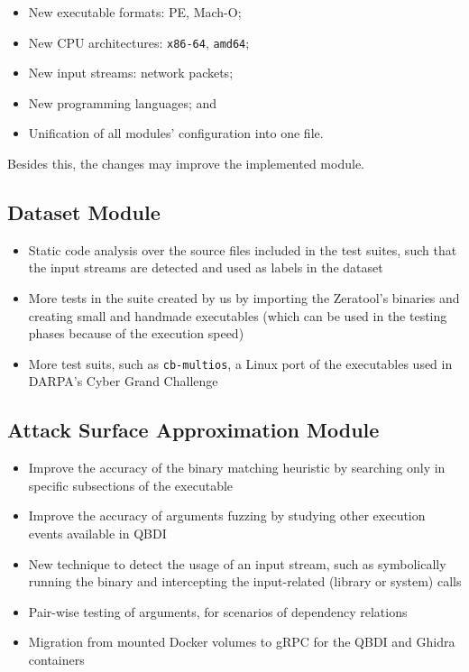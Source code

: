 \documentclass[../main.tex]{subfiles}
\begin{document}
\begin{itemize}
\tightlist
\item
  New executable formats: PE, Mach-O;
\item
  New CPU architectures: \texttt{x86-64}, \texttt{amd64};
\item
  New input streams: network packets;
\item
  New programming languages; and
\item
  Unification of all modules' configuration into one file.
\end{itemize}

Besides this, the changes may improve the implemented module.

\hypertarget{dataset-module}{%
\subsection{Dataset Module}\label{future-dataset-module}}

\begin{itemize}
\tightlist
\item
  Static code analysis over the source files included in the test
  suites, such that the input streams are detected and used as labels in
  the dataset
\item
  More tests in the suite created by us by importing the Zeratool's
  binaries and creating small and handmade executables (which can be
  used in the testing phases because of the execution speed)
\item
  More test suits, such as \texttt{cb-multios}, a Linux port of
  the executables used in DARPA's Cyber Grand Challenge
\end{itemize}

\hypertarget{attack-surface-approximation-module}{%
\subsection{Attack Surface Approximation
Module}\label{attack-surface-approximation-module}}

\begin{itemize}
\tightlist
\item
  Improve the accuracy of the binary matching heuristic by searching
  only in specific subsections of the executable
\item
  Improve the accuracy of arguments fuzzing by studying other execution
  events available in QBDI
\item
  New technique to detect the usage of an input stream, such as
  symbolically running the binary and intercepting the input-related
  (library or system) calls
\item
  Pair-wise testing of arguments, for scenarios of dependency relations
\item
  Migration from mounted Docker volumes to gRPC for the QBDI and Ghidra
  containers
\end{itemize}
\end{document}
